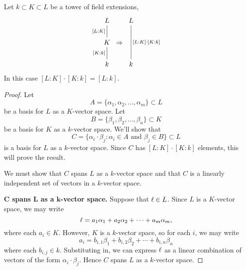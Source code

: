 \documentclass{ximera}
\begin{document}
\begin{lemma}
  Let $k\subset K\subset L$ be a tower of field extensions,
  \[
  \begin{tikzcd}[column sep=0pt]
    L\ar[d,-,"{[L:K]}",swap]  &             &  L\ar[dd,-,"{[L:K]\cdot [K:k]}"]   \\
    K \ar[d,-,"{[K:k]}",swap] & \Rightarrow &     \\
    k                         &             &  k
  \end{tikzcd}
  \]
  In this case $[L:K]\cdot [K:k] = [L:k]$.
  \begin{proof}
    Let
    \[
    A = \{\alpha_1,\alpha_2,\dots,\alpha_m\}\subset L
    \]
    be a basis for $L$ as a $K$-vector space. Let
    \[
    B = \{\beta_1,\beta_2,\dots,\beta_n\}\subset K
    \]
    be a basis for $K$ as a $k$-vector space. We'll show that
    \[
    C = \{\alpha_i\cdot \beta_j:\alpha_i\in A \text{ and }\beta_j\in B\} \subset L
    \]
    is a basis for $L$ as a $k$-vector space. Since $C$ has
    $[L:K]\cdot [K:k]$ elements, this will prove the result.

    We must show that $C$ spans $L$ as a $k$-vector space and that $C$
    is a linearly independent set of vectors in a $k$-vector space.

    \textbf{$\boldsymbol C$ spans $\boldsymbol L$ as a $\boldsymbol k$-vector space.} Suppose
    that $\ell\in L$. Since $L$ is a $K$-vector space, we may write
    \[
    \ell = a_1\alpha_1 + a_2 \alpha_2 + \cdots + a_m\alpha_m,
    \]
    where each $a_i\in K$. However, $K$ is a $k$-vector space, so for
    each $i$, we may write
    \[
    a_i = b_{i,1}\beta_1 +  b_{i,2}\beta_2 + \cdots +   b_{i,n}\beta_n
    \]
    where each $b_{i,j}\in k$. Substituting in, we can express $\ell$ as
    a linear combination of vectors of the form $\alpha_i\cdot
    \beta_j$. Hence $C$ spans $L$ as a $k$-vector space.




\end{proof}
\end{lemma}
\end{document}
